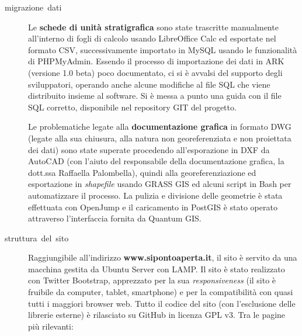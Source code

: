 \documentclass[svgnames,portrait,final,usenames,dvipsnames]{baposter}
\begin{document}
\begin{poster}
{\begin{multicols}{2}[][]
\begin{description}
                \item[migrazione~dati]

                    Le \textbf{schede di unità stratigrafica} sono state trascritte manualmente all'interno di fogli di calcolo usando LibreOffice Calc ed esportate nel formato CSV, successivamente importato in MySQL usando le funzionalità di PHPMyAdmin. Essendo il processo di importazione dei dati in ARK (versione 1.0 beta) poco documentato, ci si è avvalsi del supporto degli sviluppatori, operando anche alcune modifiche al file SQL che viene distribuito insieme al software. Si è messa a punto una guida con il file SQL corretto, disponibile nel repository GIT del progetto.

                    Le problematiche legate alla \textbf{documentazione grafica} in formato DWG (legate alla sua chiusura, alla natura non georeferenziata e non proiettata dei dati) sono state superate procedendo all'esporazione in DXF da AutoCAD (con l'aiuto del responsabile della documentazione grafica, la dott.ssa Raffaella Palombella), quindi alla georeferenziazione ed esportazione in \textit{shapefile} usando GRASS GIS ed alcuni script in Bash per automatizzare il processo. La pulizia e divisione delle geometrie è stata effettuata con OpenJump e il caricamento in PostGIS è stato operato attraverso l'interfaccia fornita da Quantum GIS.

                \item[struttura~del~sito]

                    Raggiungibile all'indirizzo \textbf{www.sipontoaperta.it}, il sito è servito da una macchina gestita da Ubuntu Server con LAMP. Il sito è stato realizzato con Twitter Bootstrap, apprezzato per la sua \emph{responsiveness} (il sito è fruibile da computer, tablet, smartphone) e per la compatibilità con quasi tutti i maggiori browser web. Tutto il codice del sito (con l'esclusione delle librerie esterne) è rilasciato su GitHub in licenza GPL v3. Tra le pagine più rilevanti:


\end{description}
\end{multicols}}
\end{poster}
\end{document}
